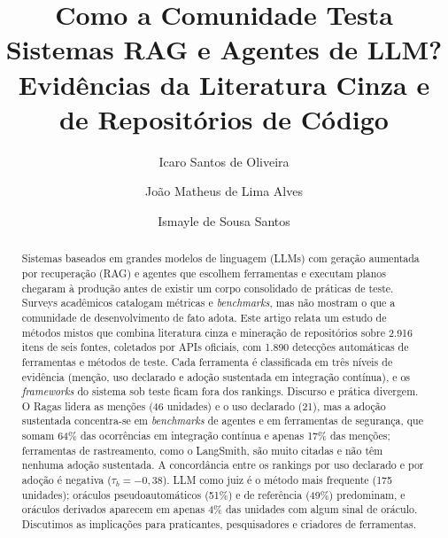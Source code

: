 \documentclass[sigconf]{acmart}
\begin{document}
\title{Como a Comunidade Testa Sistemas RAG e Agentes de LLM? Evidências da Literatura Cinza e de Repositórios de Código}

\author{Icaro Santos de Oliveira}

\author{João Matheus de Lima Alves}

\author{Ismayle de Sousa Santos}

\renewcommand{\shortauthors}{Oliveira et al.}
\renewcommand{\shorttitle}{Como a Comunidade Testa Sistemas RAG e Agentes de LLM}

\begin{abstract}
Sistemas baseados em grandes modelos de linguagem (LLMs) com geração aumentada por recuperação (RAG) e agentes que escolhem ferramentas e executam planos chegaram à produção antes de existir um corpo consolidado de práticas de teste. Surveys acadêmicos catalogam métricas e \textit{benchmarks}, mas não mostram o que a comunidade de desenvolvimento de fato adota. Este artigo relata um estudo de métodos mistos que combina literatura cinza e mineração de repositórios sobre 2.916 itens de seis fontes, coletados por APIs oficiais, com 1.890 detecções automáticas de ferramentas e métodos de teste. Cada ferramenta é classificada em três níveis de evidência (menção, uso declarado e adoção sustentada em integração contínua), e os \textit{frameworks} do sistema sob teste ficam fora dos rankings. Discurso e prática divergem. O Ragas lidera as menções (46 unidades) e o uso declarado (21), mas a adoção sustentada concentra-se em \textit{benchmarks} de agentes e em ferramentas de segurança, que somam 64\% das ocorrências em integração contínua e apenas 17\% das menções; ferramentas de rastreamento, como o LangSmith, são muito citadas e não têm nenhuma adoção sustentada. A concordância entre os rankings por uso declarado e por adoção é negativa ($\tau_b = -0{,}38$). LLM como juiz é o método mais frequente (175 unidades); oráculos pseudoautomáticos (51\%) e de referência (49\%) predominam, e oráculos derivados aparecem em apenas 4\% das unidades com algum sinal de oráculo. Discutimos as implicações para praticantes, pesquisadores e criadores de ferramentas.
\end{abstract}
\end{document}
